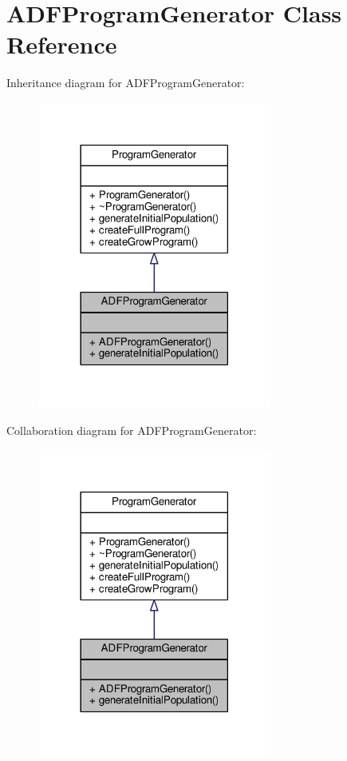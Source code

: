 \hypertarget{classADFProgramGenerator}{}\section{A\+D\+F\+Program\+Generator Class Reference}
\label{classADFProgramGenerator}


Inheritance diagram for A\+D\+F\+Program\+Generator\+:
\nopagebreak
\begin{figure}[H]
\begin{center}
\leavevmode
\includegraphics[width=218pt]{classADFProgramGenerator__inherit__graph}
\end{center}
\end{figure}


Collaboration diagram for A\+D\+F\+Program\+Generator\+:
\nopagebreak
\begin{figure}[H]
\begin{center}
\leavevmode
\includegraphics[width=218pt]{classADFProgramGenerator__coll__graph}
\end{center}
\end{figure}
